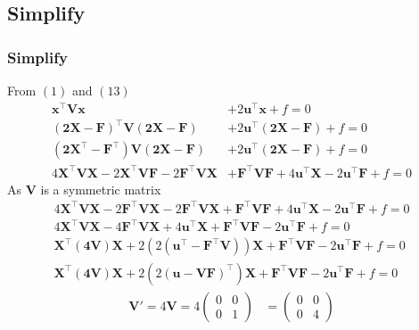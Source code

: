 \documentclass{beamer}
\providecommand{\brak}[1]{\ensuremath{\left(#1\right)}}
\theoremstyle{remark}
\newcommand{\myvec}[1]{\ensuremath{\begin{pmatrix}#1\end{pmatrix}}}
\let\vec\mathbf
\numberwithin{equation}{section}
\begin{document}
\subsection{Simplify}
\begin{frame}
\frametitle{Simplify}
From \brak{1} and \brak{13}
 \begin{align}
  \vec{x}^\top\vec{V}\vec{x} &+ 2\vec{u}^\top\vec{x} + f = 0\\
 \brak{ \vec{2\vec{X}-\vec{F} }}^\top\vec{V}\brak{\vec{2\vec{X}-\vec{F} }}& + 2\vec{u}^\top\brak{\vec{2\vec{X}-\vec{F}} } + f = 0 \\
  \brak{ \vec{2\vec{X}^\top-\vec{F}^\top }}\vec{V}\brak{\vec{2\vec{X}-\vec{F} }} &+ 2\vec{u}^\top\brak{\vec{2\vec{X}-\vec{F}} } + f = 0 \\
4\vec{X}^\top\vec{V}\vec{X}-2\vec{X}^\top\vec{V}\vec{F}-2\vec{F}^\top\vec{V}\vec{X}&+\vec{F}^\top\vec{V}\vec{F}+4\vec{u}^\top\vec{X}-2\vec{u}^\top\vec{F}+f=0
  \end{align}
   As $\vec{V}$ is a symmetric matrix
  \begin{align}
4\vec{X}^\top\vec{V}\vec{X}-2\vec{F}^\top\vec{V}\vec{X}-2\vec{F}^\top\vec{V}\vec{X}+\vec{F}^\top\vec{V}\vec{F}+4\vec{u}^\top\vec{X}-2\vec{u}^\top\vec{F}+f=0 \\
4\vec{X}^\top\vec{V}\vec{X}-4\vec{F}^\top\vec{V}\vec{X}+4\vec{u}^\top\vec{X}+\vec{F}^\top\vec{V}\vec{F}-2\vec{u}^\top\vec{F}+f=0\\
\vec{X}^\top\brak{\vec{4V}}\vec{X}+2\brak{2\brak{\vec{u}^\top-\vec{F}^\top\vec{V}}}\vec{X}+\vec{F}^\top\vec{V}\vec{F}-2\vec{u}^\top\vec{F}+f=0\\
\vec{X}^\top\brak{\vec{4V}}\vec{X}+2\brak{2\brak{\vec{u}-\vec{V}\vec{F}}^\top}\vec{X}+\vec{F}^\top\vec{V}\vec{F}-2\vec{u}^\top\vec{F}+f=0
 \end{align}
 \begin{align}
 \vec{V}'=4\vec{V}=4\myvec{0& 0 \\0&1}&=\myvec{0&0\\0&4}
 \end{align}
 \end{frame}
\end{document}
